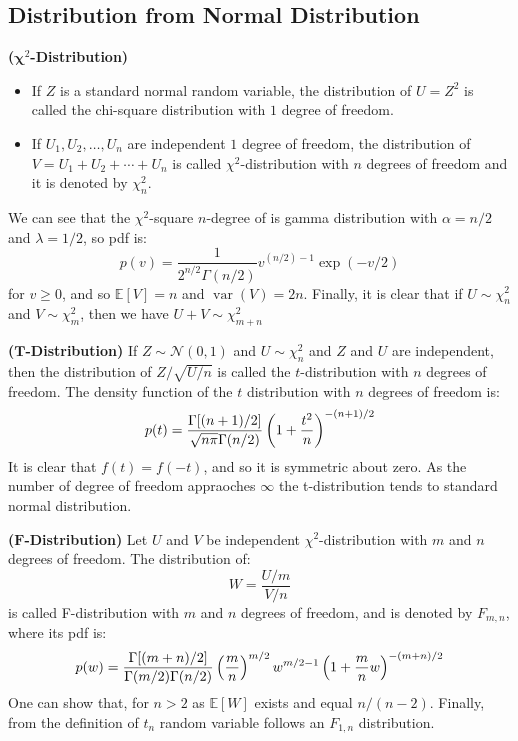 \subsection{Distribution from Normal Distribution}

\begin{definition}{\textbf{($\boldsymbol \chi^2$-Distribution)}}
    \begin{itemize}
        \item If $Z$ is a standard normal random variable, the distribution of $U = Z^2$ is called the chi-square distribution with $1$ degree of freedom.
        \item If $U_1,U_2,\dots,U_n$ are independent $1$ degree of freedom, the distribution of $V = U_1+U_2+\cdots+U_n$ is called $\chi^2$-distribution with $n$ degrees of freedom and it is denoted by $\chi^2_n$. 
    \end{itemize}
    We can see that the $\chi^2$-square $n$-degree of is gamma distribution with $\alpha=n/2$ and $\lambda=1/2$, so pdf is:
    \begin{equation*}
        p(v) = \frac{1}{2^{n/2}\Gamma(n/2)}v^{(n/2)-1}\exp(-v/2)
    \end{equation*}
    for $v\ge0$, and so $\mathbb{E}[V] = n$ and $\operatorname{var}(V) = 2n$. Finally, it is clear that if $U \sim \chi^2_{n}$ and $V\sim\chi^2_m$, then we have $U+V\sim\chi^2_{m+n}$
\end{definition}

\begin{definition}{\textbf{($\boldsymbol T$-Distribution)}}
    If $Z\sim\mathcal{N}(0, 1)$ and $U\sim\chi^2_n$ and $Z$ and $U$ are independent, then the distribution of $Z/\sqrt{U/n}$ is called the $t$-distribution with $n$ degrees of freedom. The density function of the $t$ distribution with $n$ degrees of freedom is:
    \begin{equation*}
        p(t) = \frac{\Gamma[(n+1)/2]}{\sqrt{n\pi}\Gamma(n/2)}\left( 1+\frac{t^2}{n} \right)^{-(n+1)/2}
    \end{equation*}
    It is clear that $f(t) = f(-t)$, and so it is symmetric about zero. As the number of degree of freedom appraoches $\infty$ the t-distribution tends to standard normal distribution. 
\end{definition}

\begin{definition}{\textbf{($\boldsymbol F$-Distribution)}}
    Let $U$ and $V$ be independent $\chi^2$-distribution with $m$ and $n$ degrees of freedom. The distribution of:
    \begin{equation*}
        W = \frac{U/m}{V/n}
    \end{equation*}
    is called F-distribution with $m$ and $n$ degrees of freedom, and is denoted by $F_{m,n}$, where its pdf is:
    \begin{equation*}
        p(w) = \frac{\Gamma[(m+n)/2]}{\Gamma(m/2)\Gamma(n/2)}\left( \frac{m}{n} \right)^{m/2}w^{m/2-1}\left( 1 + \frac{m}{n}w \right)^{-(m+n)/2}
    \end{equation*}
    One can show that, for $n>2$ as $\mathbb{E}[W]$ exists and equal $n/(n-2)$. Finally, from the definition of $t_n$ random variable follows an $F_{1,n}$ distribution.
\end{definition}

